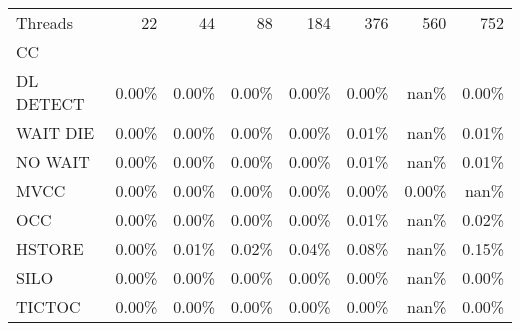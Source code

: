 \begin{tabular}{lrrrrrrr}
\toprule
Threads &   22  &   44  &   88  &   184 &   376 &   560 &   752 \\
CC        &       &       &       &       &       &       &       \\
\midrule
DL DETECT & 0.00\% & 0.00\% & 0.00\% & 0.00\% & 0.00\% &  nan\% & 0.00\% \\
WAIT DIE  & 0.00\% & 0.00\% & 0.00\% & 0.00\% & 0.01\% &  nan\% & 0.01\% \\
NO WAIT   & 0.00\% & 0.00\% & 0.00\% & 0.00\% & 0.01\% &  nan\% & 0.01\% \\
MVCC      & 0.00\% & 0.00\% & 0.00\% & 0.00\% & 0.00\% & 0.00\% &  nan\% \\
OCC       & 0.00\% & 0.00\% & 0.00\% & 0.00\% & 0.01\% &  nan\% & 0.02\% \\
HSTORE    & 0.00\% & 0.01\% & 0.02\% & 0.04\% & 0.08\% &  nan\% & 0.15\% \\
SILO      & 0.00\% & 0.00\% & 0.00\% & 0.00\% & 0.00\% &  nan\% & 0.00\% \\
TICTOC    & 0.00\% & 0.00\% & 0.00\% & 0.00\% & 0.00\% &  nan\% & 0.00\% \\
\bottomrule
\end{tabular}
